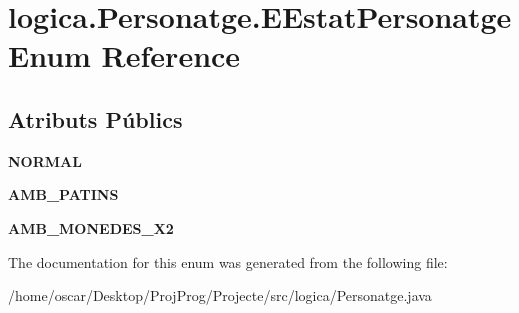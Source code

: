 \hypertarget{enumlogica_1_1_personatge_1_1_e_estat_personatge}{\section{logica.\+Personatge.\+E\+Estat\+Personatge Enum Reference}
\label{enumlogica_1_1_personatge_1_1_e_estat_personatge}
}
\subsection*{Atributs Públics}
\begin{DoxyCompactItemize}
\item 
\hypertarget{enumlogica_1_1_personatge_1_1_e_estat_personatge_a49d6707f77621ec0cf2e87fe0c3c35b6}{{\bfseries N\+O\+R\+M\+A\+L}}\label{enumlogica_1_1_personatge_1_1_e_estat_personatge_a49d6707f77621ec0cf2e87fe0c3c35b6}

\item 
\hypertarget{enumlogica_1_1_personatge_1_1_e_estat_personatge_a40e2b5b6b8e3353416efee27e6968dc2}{{\bfseries A\+M\+B\+\_\+\+P\+A\+T\+I\+N\+S}}\label{enumlogica_1_1_personatge_1_1_e_estat_personatge_a40e2b5b6b8e3353416efee27e6968dc2}

\item 
\hypertarget{enumlogica_1_1_personatge_1_1_e_estat_personatge_ab999766c5100bbcaa40fa54069c8f4d3}{{\bfseries A\+M\+B\+\_\+\+M\+O\+N\+E\+D\+E\+S\+\_\+\+X2}}\label{enumlogica_1_1_personatge_1_1_e_estat_personatge_ab999766c5100bbcaa40fa54069c8f4d3}

\end{DoxyCompactItemize}


The documentation for this enum was generated from the following file\+:\begin{DoxyCompactItemize}
\item 
/home/oscar/\+Desktop/\+Proj\+Prog/\+Projecte/src/logica/Personatge.\+java\end{DoxyCompactItemize}
